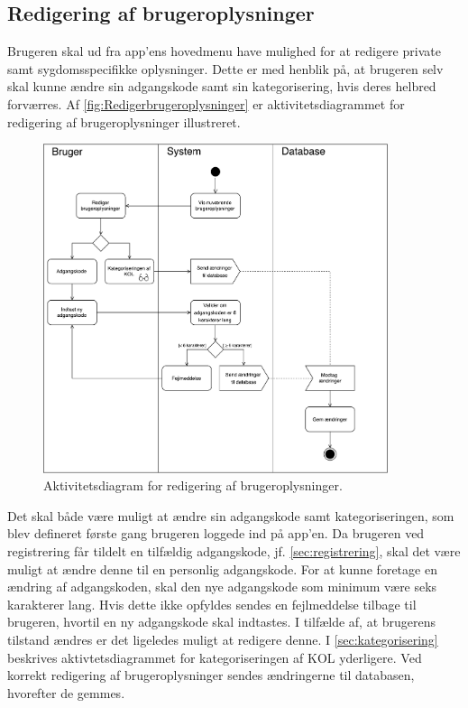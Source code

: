 \subsection{Redigering af brugeroplysninger} \label{sec:redigrering}
Brugeren skal ud fra app'ens hovedmenu have mulighed for at redigere private samt sygdomsspecifikke oplysninger. Dette er med henblik på, at brugeren selv skal kunne ændre sin adgangskode samt sin kategorisering, hvis deres helbred forværres. Af \autoref{fig:Redigerbrugeroplysninger} er aktivitetsdiagrammet for redigering af brugeroplysninger illustreret. 

\begin{figure} [H]
\centering
\includegraphics[width=0.9\textwidth]{figures/aktivitetsdiagram/Redigerbrugeroplysninger}
\caption{Aktivitetsdiagram for redigering af brugeroplysninger.}
\label{fig:Redigerbrugeroplysninger}
\end{figure}

\noindent
Det skal både være muligt at ændre sin adgangskode samt kategoriseringen, som blev defineret første gang brugeren loggede ind på app'en. Da brugeren ved registrering får tildelt en tilfældig adgangskode, jf. \autoref{sec:registrering}, skal det være muligt at ændre denne til en personlig adgangskode. For at kunne foretage en ændring af adgangskoden, skal den nye adgangskode som minimum være seks karakterer lang. Hvis dette ikke opfyldes sendes en fejlmeddelse tilbage til brugeren, hvortil en ny adgangskode skal indtastes. 
I tilfælde af, at brugerens tilstand ændres er det ligeledes muligt at redigere denne. I \autoref{sec:kategorisering} beskrives aktivtetsdiagrammet for kategoriseringen af KOL yderligere. 
Ved korrekt redigering af brugeroplysninger sendes ændringerne til databasen, hvorefter de gemmes.